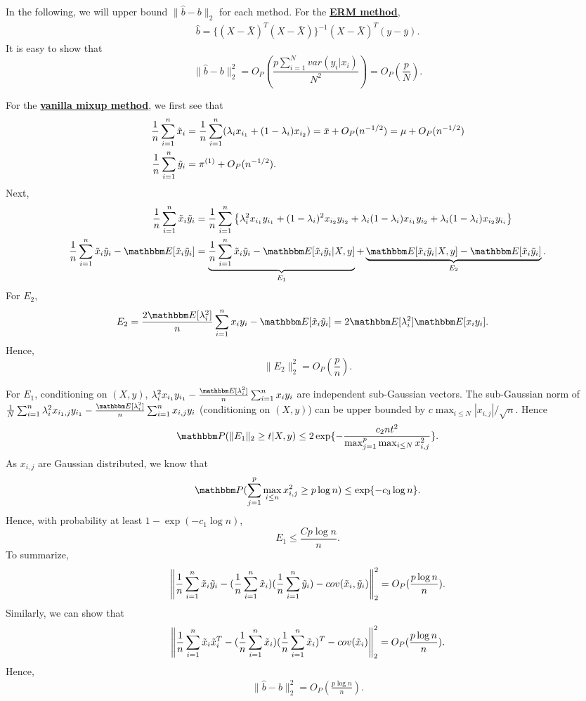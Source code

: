 In the following, we will upper bound $\|\hat{b}-b\|_2$ for each method.
For the \underline{\textbf{ERM method}}, 
\begin{align*}
    \hat{b}=\{(X-\bar{X})^T(X-\bar{X})\}^{-1}(X-\bar{X})^T(y-\bar{y}).
\end{align*}
It is easy to show that
\[
 \|\hat{b}-b\|_2^2=O_P(\frac{p\sum_{i=1}^Nvar(y_i|x_i)}{N^2})=O_P(\frac{p}{N}).
\]

For the \underline{\textbf{vanilla mixup method}}, we first see that
\begin{align*}
  \frac{1}{n}\sum_{i=1}^n\tilde{x}_i&=\frac{1}{n}\sum_{i=1}^n(\lambda_i x_{i_1}+(1-\lambda_i)x_{i_2})=\bar{x}+O_P(n^{-1/2})=\mu+O_P(n^{-1/2})\\
  \frac{1}{n}\sum_{i=1}^n\tilde{y}_i&=\pi^{(1)}+O_P(n^{-1/2}).
\end{align*}
Next,
\begin{align*}
    \frac{1}{n}\sum_{i=1}^n\tx_i\ty_i&=  \frac{1}{n}\sum_{i=1}^n\left\{\lam_i^2x_{i_1}y_{i_1}+(1-\lam_i)^2x_{i_2}y_{i_2}+\lam_i(1-\lam_i)x_{i_1}y_{i_2}+\lam_i(1-\lam_i)x_{i_2}y_{i_i}\right\}\\
  \frac{1}{n}\sum_{i=1}^n\tx_i\ty_i- \E[\tx_i\ty_i]  &=\underbrace{\frac{1}{n}\sum_{i=1}^n \tx_i\ty_i-\E[\tx_i\ty_i|X,y]}_{E_1}+\underbrace{\E[\tx_i\ty_i|X,y]-\E[\tx_i\ty_i]}_{E_2}.
\end{align*}
For $E_2$,
\begin{align*}
    E_2&=\frac{2\E[\lam_i^2]}{n}\sum_{i=1}^nx_iy_i-\E[\tx_i\ty_i]=2\E[\lam_i^2]\E[x_iy_i].
\end{align*}
Hence,
\[
  \|E_2\|_2^2=O_P(\frac{p}{n}).
\]

For $E_1$, conditioning on $(X,y)$, $\lam_i^2x_{i_1}y_{i_1}-\frac{\E[\lam_i^2]}{n}\sum_{i=1}^nx_iy_i$ are independent sub-Gaussian vectors. The sub-Gaussian norm of $\frac{1}{N}\sum_{i=1}^n\lam_i^2x_{i_1,j}y_{i_1}-\frac{\E[\lam_i^2]}{n}\sum_{i=1}^nx_{i,j}y_i$ (conditioning on $(X,y)$) can be upper bounded by $c\max_{i\leq N}|x_{i,j}|/\sqrt{n}$. Hence
\begin{align*}
   \P(\|E_1\|_2\geq t|X,y)\leq 2\exp\{-\frac{c_2nt^2}{\max_{j=1}^p\max_{i\leq N}x_{i,j}^2}\}.
\end{align*}
As $x_{i,j}$ are Gaussian distributed, we know that
\[
\P(\sum_{j=1}^p\max_{i\leq n}x_{i,j}^2\geq p\log n)\leq \exp\{-c_3\log n\}.
\]
Hence,
with probability at least $1-\exp(-c_1\log n)$, 
\[
   E_1\leq \frac{Cp\log n}{n}.
\]
To summarize,
\[
   \left\|\frac{1}{n}\sum_{i=1}^n\tilde{x}_i\tilde{y}_i-(\frac{1}{n}\sum_{i=1}^n\tilde{x}_i)(\frac{1}{n}\sum_{i=1}^n\tilde{y}_i)-cov(\tilde{x}_i,\tilde{y}_i)\right\|_2^2=O_P(\frac{p\log n}{n}).
\]
Similarly, we can show that
\[
   \left\|\frac{1}{n}\sum_{i=1}^n\tilde{x}_i\tilde{x}_i^T-(\frac{1}{n}\sum_{i=1}^n\tilde{x}_i)(\frac{1}{n}\sum_{i=1}^n\tilde{x}_i)^T-cov(\tilde{x}_i)\right\|_2^2=O_P(\frac{p\log n}{n}).
\]
Hence,
\begin{align*}
    \|\hat{b}-b\|_2^2=O_P(\frac{p\log n}{n}).
\end{align*}

